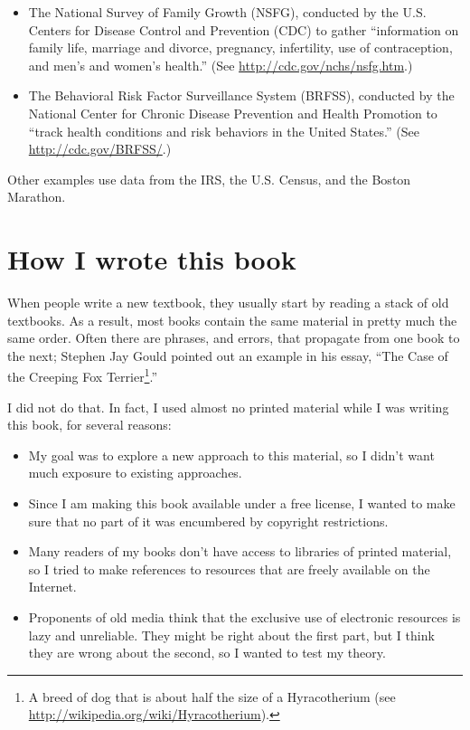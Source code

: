 \documentclass[12pt]{book}
\begin{document}
\begin{itemize}

\item The National Survey of Family Growth (NSFG), conducted by the
  U.S. Centers for Disease Control and Prevention (CDC) to gather
  ``information on family life, marriage and divorce, pregnancy,
  infertility, use of contraception, and men's and women's health.''
  (See \url{http://cdc.gov/nchs/nsfg.htm}.)

\item The Behavioral Risk Factor Surveillance System (BRFSS),
  conducted by the National Center for Chronic Disease Prevention and
  Health Promotion to ``track health conditions and risk behaviors in
  the United States.''  (See \url{http://cdc.gov/BRFSS/}.)

\end{itemize}

Other examples use data from the IRS, the U.S. Census, and
the Boston Marathon.


\section*{How I wrote this book}

When people write a new textbook, they usually start by
reading a stack of old textbooks.  As a result, most books
contain the same material in pretty much the same order.  Often there
are phrases, and errors, that propagate from one book to the next;
Stephen Jay Gould pointed out an example in his essay, ``The Case of
the Creeping Fox Terrier\footnote{A breed of dog that is about half
  the size of a Hyracotherium (see
  \url{http://wikipedia.org/wiki/Hyracotherium}).}.''

I did not do that.  In fact, I used almost no printed material while I
was writing this book, for several reasons:

\begin{itemize}

\item My goal was to explore a new approach to this material, so I didn't
want much exposure to existing approaches.

\item Since I am making this book available under a free license, I wanted
to make sure that no part of it was encumbered by copyright restrictions.

\item Many readers of my books don't have access to libraries of
printed material, so I tried to make references to resources that are
freely available on the Internet.

\item Proponents of old media think that the exclusive
use of electronic resources is lazy and unreliable.  They might be right
about the first part, but I think they are wrong about the second, so
I wanted to test my theory.


\end{itemize}
\end{document}

